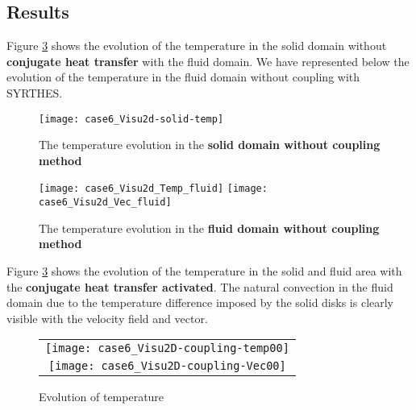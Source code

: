         \subsection{Results}

Figure \ref{fige2_e5} shows the evolution of the temperature in the solid domain
without {\bf conjugate heat transfer} with the fluid domain. We have represented
below the evolution of the temperature in the fluid domain without coupling with
SYRTHES.

\begin{figure}[h!]
\begin{center}
\texttt{[image: case6\_Visu2d-solid-temp]}
\caption{The temperature evolution in the {\bf solid domain without coupling method} }
\label{fige4_e5}
\end{center}
\end{figure}

\begin{figure}[h!]
\begin{center}
\texttt{[image: case6\_Visu2d\_Temp\_fluid]}
\texttt{[image: case6\_Visu2d\_Vec\_fluid]}
\caption{The temperature evolution in the {\bf fluid domain without coupling method}}
\label{fige4_e5}
\end{center}
\end{figure}


Figure \ref{fige2_e5} shows the evolution of the temperature in the solid and fluid area with
the {\bf conjugate heat transfer activated}. The natural convection in the fluid domain due to the
temperature difference imposed by the solid disks is clearly visible with the velocity field and vector.

\begin{figure}
\begin{center}
\begin{tabular}{c}
\texttt{[image: case6\_Visu2D-coupling-temp00]} \\
\texttt{[image: case6\_Visu2D-coupling-Vec00]}  \\
\end{tabular}
\caption{Evolution of temperature}
\label{fige2_e5}
\end{center}
\end{figure}




